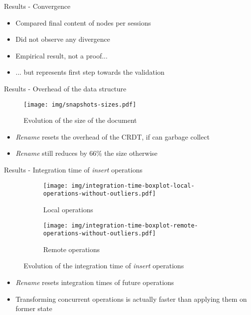 \documentclass[10pt]{beamer}
\begin{document}
\begin{frame}{Results - Convergence}
  \begin{itemize}
    \item Compared final content of nodes per sessions
    \item Did not observe any divergence
    \pause
    \medskip
    \item Empirical result, not a proof...
    \item ... but represents first step towards the validation
  \end{itemize}
\end{frame}

\begin{frame}{Results - Overhead of the data structure}
  \begin{figure}
    \centering
    \texttt{[image: img/snapshots-sizes.pdf]}
    \caption{Evolution of the size of the document}
    \label{fig:evolution-document-size}
  \end{figure}

  \vspace{-1\baselineskip}
  \begin{itemize}
    \pause
    \item \emph{Rename} resets the overhead of the CRDT, if can garbage collect
    \pause
    \item \emph{Rename} still reduces by $66\%$ the size otherwise
  \end{itemize}
\end{frame}

\begin{frame}{Results - Integration time of \emph{insert} operations}
  \begin{figure}
    \captionsetup[subfigure]{aboveskip=-1pt,belowskip=-1pt}
    \centering
    \begin{subfigure}{0.47\textwidth}
        \texttt{[image: img/integration-time-boxplot-local-operations-without-outliers.pdf]}
        \caption{Local operations}
        \label{fig:evolution-integration-time-local-insert-remove}
    \end{subfigure}
    \begin{subfigure}{0.47\textwidth}
        \texttt{[image: img/integration-time-boxplot-remote-operations-without-outliers.pdf]}
        \caption{Remote operations}
        \label{fig:evolution-integration-time-remote-insert-remove}
    \end{subfigure}
    \caption{Evolution of the integration time of \emph{insert} operations}
    \label{fig:evolution-integration-time-insert-remove}
  \end{figure}

  \vspace{-1\baselineskip}
  \begin{itemize}
    \pause
    \item \emph{Rename} resets integration times of future operations
    \pause
    \item Transforming concurrent operations is actually faster than applying them on former state
  \end{itemize}

\end{frame}
\end{document}
